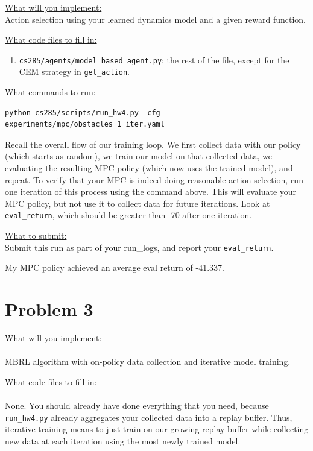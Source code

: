 \documentclass{article} %
\begin{document}
\underline{What will you implement:}\\ 
Action selection using your learned dynamics model and a given reward function.

\underline{What code files to fill in:}
\begin{enumerate}
    \item \verb+cs285/agents/model_based_agent.py+: the rest of the file, except for the CEM strategy in \verb+get_action+.
\end{enumerate}

\underline{What commands to run:}\\
\begin{lstlisting}[escapechar=@]
python cs285/scripts/run_hw4.py -cfg experiments/mpc/obstacles_1_iter.yaml
\end{lstlisting}

Recall the overall flow of our training loop. We first collect data with our policy (which starts as random), we train our model on that collected data, we evaluating the resulting MPC policy (which now uses the trained model), and repeat.
To verify that your MPC is indeed doing reasonable action selection, run one iteration of this process using the command above.
This will evaluate your MPC policy, but not use it to collect data for future iterations.
Look at \verb+eval_return+, which should be greater than -70 after one iteration.

\underline{What to submit:}\\
Submit this run as part of your run\_logs, and report your \verb+eval_return+.

\begin{sol}
  My MPC policy achieved an average eval return of -41.337.
\end{sol}

\newpage
\section*{Problem 3}

\underline{What will you implement:}\\ \\
MBRL algorithm with on-policy data collection and iterative model training.

\underline{What code files to fill in:}\\ \\
None. You should already have done everything that you need, because \verb+run_hw4.py+ already aggregates your collected data into a replay buffer. Thus, iterative training means to just train on our growing replay buffer while collecting new data at each iteration using the most newly trained model.
\end{document}
